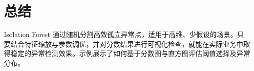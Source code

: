 \documentclass[UTF8,zihao=-4]{ctexart}
\begin{document}
\FloatBarrier
\section{总结}
Isolation Forest 通过随机分割高效孤立异常点，适用于高维、少假设的场景。只要结合特征缩放与参数调优，并对分数结果进行可视化检查，就能在实际业务中取得稳定的异常检测效果。示例展示了如何基于分数图与直方图评估阈值选择及异常分布。
\end{document}
